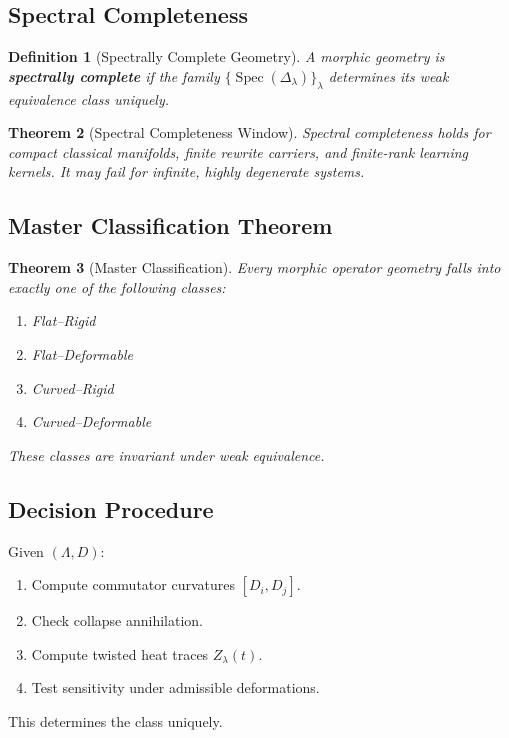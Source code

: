 \documentclass[12pt, oneside]{article}
\newtheorem{theorem}{Theorem}[section]
\newtheorem{definition}[theorem]{Definition}
\DeclareMathOperator{\Spec}{Spec}
\begin{document}
\subsection{Spectral Completeness}

\begin{definition}[Spectrally Complete Geometry]
A morphic geometry is \textbf{spectrally complete} if the family $\{\Spec(\Delta_\lambda)\}_{\lambda}$ determines its weak equivalence class uniquely.
\end{definition}

\begin{theorem}[Spectral Completeness Window]
Spectral completeness holds for compact classical manifolds, finite rewrite carriers, and finite-rank learning kernels. It may fail for infinite, highly degenerate systems.
\end{theorem}

\subsection{Master Classification Theorem}

\begin{theorem}[Master Classification]
Every morphic operator geometry falls into exactly one of the following classes:
\begin{enumerate}
    \item Flat--Rigid
    \item Flat--Deformable
    \item Curved--Rigid
    \item Curved--Deformable
\end{enumerate}
These classes are invariant under weak equivalence.
\end{theorem}

\subsection{Decision Procedure}

Given $(\Lambda, D)$:
\begin{enumerate}
    \item Compute commutator curvatures $[D_i, D_j]$.
    \item Check collapse annihilation.
    \item Compute twisted heat traces $Z_\lambda(t)$.
    \item Test sensitivity under admissible deformations.
\end{enumerate}
This determines the class uniquely.
\end{document}
